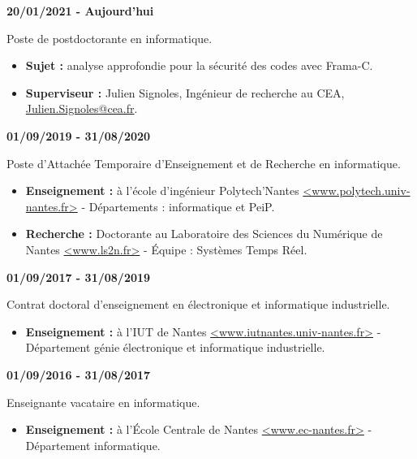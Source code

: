 \vspace{0.5cm}


\hspace{-0.7cm}\textbf{20/01/2021 - Aujourd'hui}

Poste de postdoctorante en informatique.
\begin{itemize}
	\item \textbf{Sujet :} analyse approfondie pour la sécurité des codes avec Frama-C.
	
	\item\textbf{ Superviseur : } Julien Signoles, Ingénieur de recherche au CEA, \url{Julien.Signoles@cea.fr}.  
\end{itemize}


\hspace{-0.7cm}\textbf{01/09/2019 - 31/08/2020}

		Poste d'Attachée Temporaire d'Enseignement et de Recherche en informatique.
		\begin{itemize}
			\item \textbf{Enseignement :} à l'école d'ingénieur Polytech'Nantes \url{<www.polytech.univ-nantes.fr>} - Départements : informatique et PeiP.
			
			\item\textbf{ Recherche : } Doctorante au Laboratoire des Sciences du Numérique de Nantes \url{<www.ls2n.fr>} - Équipe : Systèmes Temps Réel.
		\end{itemize}



\hspace{-0.7cm}\textbf{01/09/2017 - 31/08/2019}

		Contrat doctoral d'enseignement en électronique et informatique industrielle.
		\begin{itemize}
			\item \textbf{Enseignement :} à l'IUT de Nantes \url{<www.iutnantes.univ-nantes.fr>} - Département génie électronique et informatique industrielle.
		\end{itemize}



\hspace{-0.7cm}\textbf{01/09/2016 - 31/08/2017}

		Enseignante vacataire en informatique.
		\begin{itemize}
			\item \textbf{Enseignement :} à l'École Centrale de Nantes \url{<www.ec-nantes.fr>} - Département informatique.
		\end{itemize}



